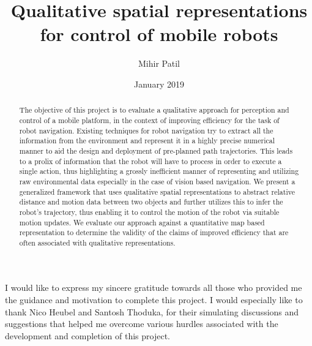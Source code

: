 \documentclass[rnd]{mas_report}
\author{Mihir Patil}
\title{Qualitative spatial representations for control of mobile robots}
\date{January  2019}
\begin{document}
\begin{titlepage}
    \maketitle
\end{titlepage}


\pagestyle{plain}


\cleardoublepage
\statementpage

\begin{abstract}
\paragraph{}The objective of this project is to evaluate a qualitative approach for perception and control of a mobile platform, in the context of improving efficiency for the task of robot navigation. Existing techniques for robot navigation try to extract all the information from the environment and represent it in a highly precise numerical manner to aid the design and deployment of pre-planned path trajectories. This leads to a prolix of information that the robot will have to process in order to execute a single action, thus highlighting a grossly inefficient manner of representing and utilizing raw environmental data especially in the case of vision based navigation. We present a generalized framework that uses qualitative spatial representations to abstract relative distance and motion data between two objects and further utilizes this to infer the robot's trajectory, thus enabling it to control the motion of the robot via suitable motion updates. We evaluate our approach against a quantitative map based representation to determine the validity of the claims of improved efficiency that are often associated with qualitative representations.
\end{abstract}

\begin{acknowledgements}
\paragraph{}I would like to express my sincere gratitude towards  all those who provided me the guidance and motivation to complete this project.  I would especially like to thank Nico Heubel and Santosh Thoduka, for their simulating discussions and suggestions
that helped me overcome various hurdles associated with the development and completion of this project.
\end{acknowledgements}
\end{document}
